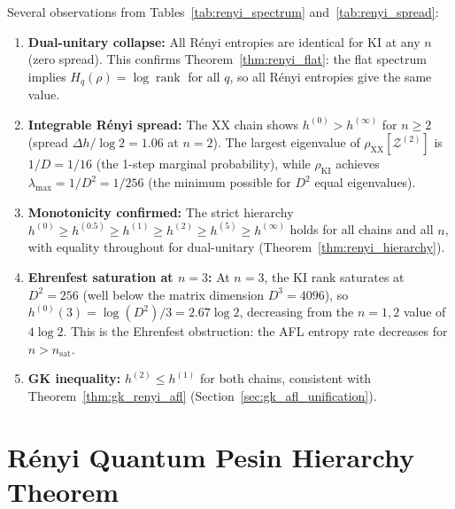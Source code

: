 \documentclass[12pt,a4paper]{article}
\begin{document}
Several observations from Tables~\ref{tab:renyi_spectrum}
and~\ref{tab:renyi_spread}:

\begin{enumerate}
  \item \textbf{Dual-unitary collapse:} All R\'enyi entropies are
    identical for KI at any $n$ (zero spread). This confirms
    Theorem~\ref{thm:renyi_flat}: the flat spectrum implies $H_q(\rho) =
    \log\operatorname{rank}$ for all $q$, so all Rényi entropies give
    the same value.

  \item \textbf{Integrable Rényi spread:} The XX chain shows $h^{(0)} > h^{(\infty)}$
    for $n \geq 2$ (spread $\Delta h / \log 2 = 1.06$ at $n=2$).  The largest
    eigenvalue of $\rho_{\mathrm{XX}}[\mathcal{Z}^{(2)}]$ is $1/D = 1/16$
    (the 1-step marginal probability), while $\rho_{\mathrm{KI}}$ achieves
    $\lambda_{\max} = 1/D^2 = 1/256$ (the minimum possible for $D^2$ equal
    eigenvalues).

  \item \textbf{Monotonicity confirmed:} The strict hierarchy
    $h^{(0)} \geq h^{(0.5)} \geq h^{(1)} \geq h^{(2)} \geq h^{(5)} \geq h^{(\infty)}$
    holds for all chains and all $n$, with equality throughout for
    dual-unitary (Theorem~\ref{thm:renyi_hierarchy}).

  \item \textbf{Ehrenfest saturation at $n=3$:}
    At $n=3$, the KI rank saturates at $D^2 = 256$ (well below the
    matrix dimension $D^3 = 4096$), so $h^{(0)}(3) = \log(D^2)/3 = 2.67\log 2$,
    decreasing from the $n=1,2$ value of $4\log 2$.  This is the Ehrenfest
    obstruction: the AFL entropy rate decreases for $n > n_{\mathrm{sat}}$.

  \item \textbf{GK inequality:} $h^{(2)} \leq h^{(1)}$ for both chains,
    consistent with Theorem~\ref{thm:gk_renyi_afl} (Section~\ref{sec:gk_afl_unification}).
\end{enumerate}

\section{R\'enyi Quantum Pesin Hierarchy Theorem}
\label{sec:renyi_pesin}
\end{document}

